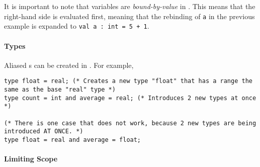 It is important to note that variables are \emph{bound-by-value} in .
This means that the right-hand side is evaluated first, meaning that the rebinding of \texttt{a} in the previous example is expanded to \texttt{val a : int = 5 + 1}.

\paragraph{Types}\label{par:Functional-SML-Type_Declarations}
Aliased s can be created in .
For example,
\begin{verbatim}
type float = real; (* Creates a new type "float" that has a range the same as the base "real" type *)
type count = int and average = real; (* Introduces 2 new types at once *)

(* There is one case that does not work, because 2 new types are being introduced AT ONCE. *)
type float = real and average = float;
\end{verbatim}

\paragraph{Limiting Scope}\label{par:Functional-SML-Limit_Scope}

